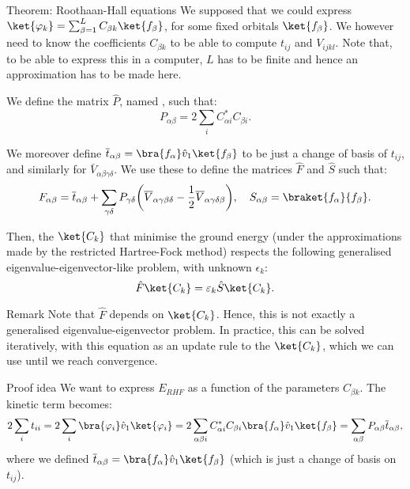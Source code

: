 \documentclass[a4paper]{article}
\begin{document}
\begin{parag}{Theorem: Roothaan-Hall equations}
    We supposed that we could express $\ket{\phi_k} = \sum_{\beta=1}^L C_{\beta k} \ket{f_{\beta}}$, for some fixed orbitals $\ket{f_{\beta}}$. We however need to know the coefficients $C_{\beta k}$ to be able to compute $t_{ij}$ and $V_{ijkl}$. Note that, to be able to express this in a computer, $L$ has to be finite and hence an approximation has to be made here.

    We define the matrix $\hat{P}$, named , such that: 
    \[P_{\alpha \beta} = 2 \sum_{i} C_{\alpha i}^* C_{\beta i}.\]

    We moreover define $\bar{t}_{\alpha \beta} = \bra{f_{\alpha}} \hat{v}_1 \ket{f_{\beta}}$ to be just a change of basis of $t_{ij}$, and similarly for $\bar{V}_{\alpha \beta \gamma \delta}$. We use these to define the matrices $\hat{F}$ and $\hat{S}$ such that:
    \[F_{\alpha \beta} = \bar{t}_{\alpha \beta} + \sum_{\gamma \delta} P_{\gamma \delta} \left(\bar{V}_{\alpha \gamma \beta \delta} - \frac{1}{2} \bar{V}_{\alpha \gamma \delta \beta}\right), \mathspace S_{\alpha \beta} = \braket{f_{\alpha}}{f_{\beta}}.\]

    Then, the $\ket{C_k}$ that minimise the ground energy (under the approximations made by the restricted Hartree-Fock method) respects the following generalised eigenvalue-eigenvector-like problem, with unknown $\epsilon_k$: 
    \[\hat{F} \ket{C_k} = \epsilon_k \hat{S} \ket{C_k}.\]

    \begin{subparag}{Remark}
        Note that $\hat{F}$ depends on $\ket{C_k}$. Hence, this is not exactly a generalised eigenvalue-eigenvector problem. In practice, this can be solved iteratively, with this equation as an update rule to the $\ket{C_k}$, which we can use until we reach convergence.
    \end{subparag}

    \begin{subparag}{Proof idea}
        We want to express $E_{RHF}$ as a function of the parameters $C_{\beta k}$. The kinetic term becomes:
        \[2 \sum_{i} t_{ii} = 2 \sum_{i} \bra{\phi_i} \hat{v}_1 \ket{\phi_i} = 2 \sum_{\alpha \beta i} C_{\alpha i}^* C_{\beta i} \bra{f_{\alpha}} \hat{v}_1 \ket{f_{\beta}} = \sum_{\alpha \beta} P_{\alpha \beta} \bar{t}_{\alpha \beta},\]   
        where we defined $\bar{t}_{\alpha \beta} = \bra{f_{\alpha}} \hat{v}_1 \ket{f_{\beta}}$ (which is just a change of basis on $t_{ij}$). 


\end{subparag}
\end{parag}
\end{document}
